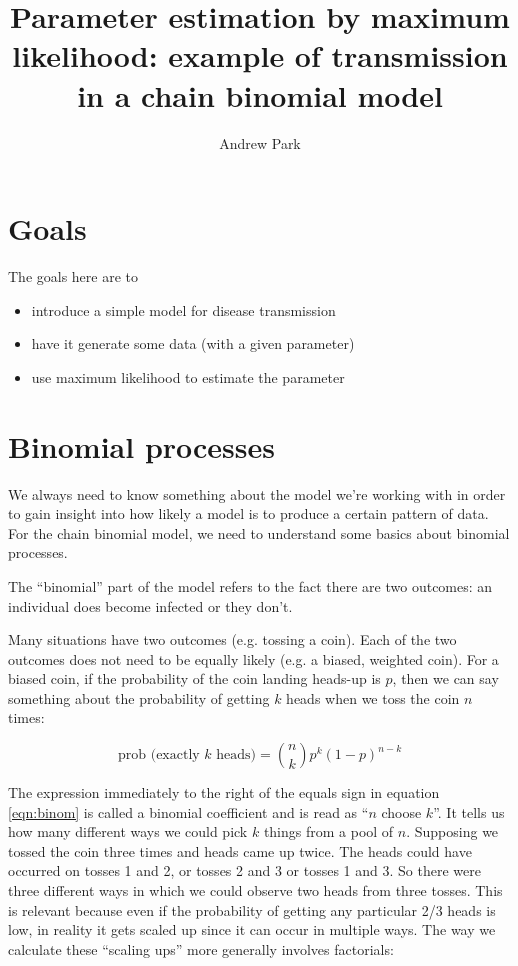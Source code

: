 \documentclass{article}
\begin{document}


\title{Parameter estimation by maximum likelihood: example of transmission in a chain binomial model}
\author{Andrew Park}

\maketitle
\section*{Goals}
The goals here are to 
\begin{itemize}
\item introduce a simple model for disease transmission
\item have it generate some data (with a given parameter)
\item use maximum likelihood to estimate the parameter
\end{itemize}

\section*{Binomial processes}
We always need to know something about the model we're working with in order to gain insight into how likely a model is to produce a certain pattern of data. For the chain binomial model, we need to understand some basics about binomial processes. 

The ``binomial'' part of the model refers to the fact there are two outcomes: an individual does become infected or they don't.

Many situations have two outcomes (e.g. tossing a coin). Each of the two outcomes does not need to be equally likely (e.g. a biased, weighted coin). For a biased coin, if the probability of the coin landing heads-up is $p$, then we can say something about the probability of getting $k$ heads when we toss the coin $n$ times:

\begin{equation}
\text{prob (exactly $k$ heads)}={n \choose k} p^k (1-p)^{n-k}
\label{eqn:binom}
\end{equation}

The expression immediately to the right of the equals sign in equation \ref{eqn:binom} is called a binomial coefficient and is read as ``$n$ choose $k$''. It tells us how many different ways we could pick $k$ things from a pool of $n$. Supposing we tossed the coin three times and heads came up twice. The heads could have occurred on tosses 1 and 2, or tosses 2 and 3 or tosses 1 and 3. So there were three different ways in which we could observe two heads from three tosses. This is relevant because even if the probability of getting any particular 2/3 heads is low, in reality it gets scaled up since it can occur in multiple ways. The way we calculate these ``scaling ups'' more generally involves factorials:
\end{document}
